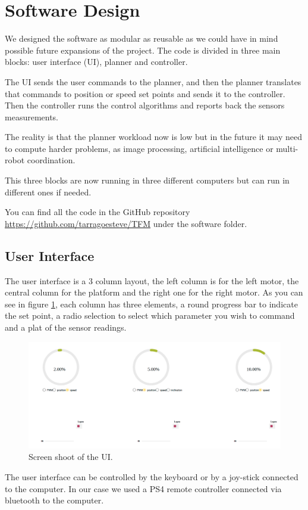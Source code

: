 \section{Software Design}
We designed the software as modular as reusable as we could have in mind
possible future expansions of the project.
The code is divided in three main blocks: user interface (UI), planner and controller.

The UI sends the user commands to the planner, and then the planner translates that commands to
position or speed set points and sends it to the controller. Then the controller runs the control algorithms
and reports back the sensors measurements.

The reality is that the planner workload now is low but in the future it may need to compute harder problems,
as image processing, artificial intelligence or multi-robot coordination.

This three blocks are now running in three different computers but can run in different ones if needed.

You can find all the code in the GitHub repository \url{https://github.com/tarragoesteve/TFM} under the 
software folder.

\subsection{User Interface}
The user interface is a 3 column layout, the left column is for the left motor, the central column for the platform
and the right one for the right motor. As you can see in figure \ref{fig: UI}, each column has three elements,
a round progress bar to indicate the set point, a radio selection to select which parameter you wish to command and a plat
of the sensor readings.
\begin{figure}[H]
    \centering
    \includegraphics[width=12cm]{img/components/ui.png}
    \caption{Screen shoot of the UI.}
    \label{fig: UI}
\end{figure}
The user interface can be controlled by the keyboard or by a joy-stick connected to the computer. In our case
we used a PS4 remote controller connected via bluetooth to the computer.

